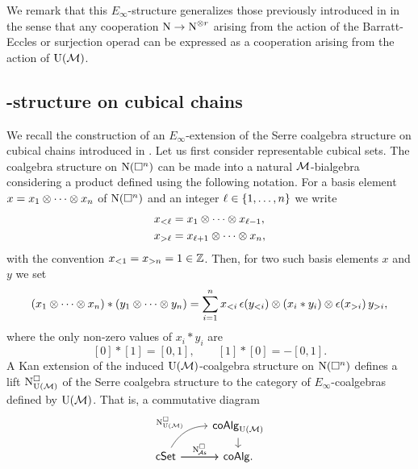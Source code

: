 We remark that this $E_\infty$-structure generalizes those previously introduced in \cite{mcclure2003multivariable,berger2004combinatorial} in the sense that any cooperation $\operatorname{N} \to \operatorname{N}^{\otimes r}$ arising from the action of the Barratt-Eccles or surjection operad can be expressed as a cooperation arising from the action of ${\operatorname{U}(\mathcal{M})}$.

\subsection{\pdfEinfty-structure on cubical chains}\label{ss:cubical e-infty}

We recall the construction of an $E_\infty$-extension of the Serre coalgebra structure on cubical chains introduced in \cite{medina2022cube_einfty}.
Let us first consider representable cubical sets.
The coalgebra structure on $\operatorname{N}(\square^n)$ can be made into a natural $\mathcal{M}$-bialgebra considering a product defined using the following notation.
For a basis element $x = x_1 \otimes \dotsb \otimes x_n$ of $\operatorname{N}(\square^n)$ and an integer $\ell \in \{1,\dots,n\}$ we write
\begin{align*}
	x_{<\ell} & = x_1 \otimes \dotsb \otimes x_{\ell-1}, \\
	x_{>\ell} & = x_{\ell+1} \otimes \dotsb \otimes x_n,
\end{align*}
with the convention $x_{<1} = x_{>n} = 1 \in \mathbb{Z}$.
Then, for two such basis elements $x$ and $y$ we set
\begin{equation}\label{eq:product on cubes}
	(x_1 \otimes \dotsb \otimes x_n) \ast (y_1 \otimes \dotsb \otimes y_n) =
	\sum_{i=1}^n x_{<i}\, \epsilon(y_{<i}) \otimes (x_i \ast y_i) \otimes \epsilon(x_{>i}) \, y_{>i},
\end{equation}
where the only non-zero values of $x_i \ast y_i$ are
\[
[0] \ast [1] = [0, 1], \qquad [1] \ast [0] = -[0, 1].
\]
A Kan extension of the induced ${\operatorname{U}(\mathcal{M})}$-coalgebra structure on $\operatorname{N}(\square^n)$ defines a lift $\operatorname{N^{\square}_{{\operatorname{U}(\mathcal{M})}}}$ of the Serre coalgebra structure to the category of $E_\infty$-coalgebras defined by ${\operatorname{U}(\mathcal{M})}$.
That is, a commutative diagram
\begin{equation}\label{eq:lift to e-infty cubical}
	\begin{tikzcd}[column sep=normal, row sep=small]
		& \coAlg_{\UM} \arrow[d] \\
		\cSet \arrow[r]
		\arrow[ur,out=60, in=180, "\cchainsUM"]
		\arrow[r, "\cchainsA"]
		& \coAlg.
	\end{tikzcd}
\end{equation}

